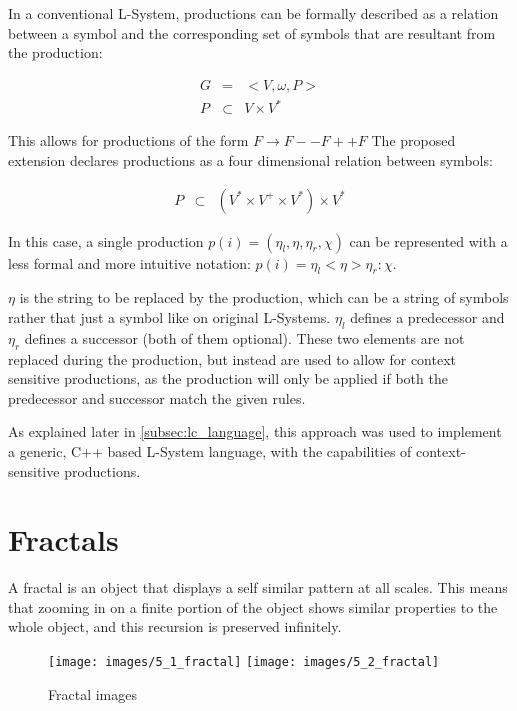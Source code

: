 \documentclass{acmtog}
\begin{document}
In a conventional L-System, productions can be formally described as a relation between a symbol and the corresponding set of symbols that are resultant from the production:

\begin{eqnarray*}
  G &=& <V, \omega, P>        \\
  P &\subset& V \times V^{*}
\end{eqnarray*}

This allows for productions of the form $F \rightarrow F--F++F$
The proposed extension declares productions as a four dimensional relation between symbols:

\begin{eqnarray*}
  P &\subset& (V^{*} \times V^{+} \times V^{*}) \times V^{*}
\end{eqnarray*}

In this case, a single production $ p(i) = (\eta_{l}, \eta, \eta_{r}, \chi)$ can be represented with a less formal and more intuitive notation: $ p(i) = \eta_{l} < \eta > \eta_{r} : \chi$.

$\eta$ is the string to be replaced by the production, which can be a string of symbols rather that just a symbol like on original L-Systems. $\eta_{l}$ defines a predecessor and $\eta_{r}$ defines a successor (both of them optional). These two elements are not replaced during the production, but instead are used to allow for context sensitive productions, as the production will only be applied if both the predecessor and successor match the given rules.

As explained later in \autoref{subsec:lc_language}, this approach was used to implement a generic, C++ based L-System language, with the capabilities of context-sensitive productions.

\section{Fractals}
\label{sec:fractals}

A fractal is an object that displays a self similar pattern at all scales. This means that zooming in on a finite portion of the object shows similar properties to the whole object, and this recursion is preserved infinitely.

\begin{figure}[!htp]
  \begin{center}
    \texttt{[image: images/5\_1\_fractal]}
    \texttt{[image: images/5\_2\_fractal]}
    \caption{Fractal images \label{fig:fractais}}
    \end{center}
\end{figure}
\end{document}
